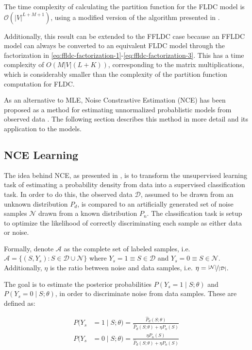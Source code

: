 \begin{proposition}
  The time complexity of calculating the partition function for the FLDC model is $\mathcal{O}(|V|^{L+M+1})$, using a modified version of the algorithm presented in \cite{tschiatschek16learning}.
\end{proposition}

Additionally, this result can be extended to the FFLDC case because an FFLDC model can always be converted to an equivalent FLDC model through the factorization in \ref{eq:ffldc-factorization-1}-\ref{eq:ffldc-factorization-3}. This has a time complexity of $O(M|V|(L+K))$, corresponding to the matrix multiplications, which is considerably smaller than the complexity of the partition function computation for FLDC.

As an alternative to MLE, Noise Constrastive Estimation (NCE) has been proposed as a method for estimating unnormalized probablistic models from observed data \cite{Gutmann12NCE}. The following section describes this method in more detail and its application to the models.

\subsection{NCE Learning}

The idea behind NCE, as presented in \cite{Gutmann12NCE}, is to transform the unsupervised learning task of estimating a probability density from data into a supervised classification task. In order to do this, the observed data $\mathcal{D}$, assumed to be drawn from an unknown distribution $P_{d}$, is compared to an artificially generated set of noise samples $\mathcal{N}$ drawn from a known distribution $P_{n}$. The classification task is setup to optimize the likelihood of correctly discriminating each sample as either data or noise.

Formally, denote $\mathcal{A}$ as the complete set of labeled samples, i.e. $\mathcal{A} = \{(S,Y_{s}) : S \in \mathcal{D} \cup \mathcal{N}\}$ where $Y_{s} = 1 \equiv S \in \mathcal{D}$ and $Y_{s} = 0 \equiv S \in \mathcal{N}$. Additionally, $\eta$ is the ratio between noise and data samples, i.e. $\eta = \nicefrac{|\mathcal{N}|}{|\mathcal{D}|}$.

The goal is to estimate the posterior probabilities $P(Y_{s} = 1 \mid S;\theta)$ and $P(Y_{s} = 0 \mid S;\theta)$, in order to discriminate noise from data samples. These are defined as:

\begin{align}
  P(Y_{s} &= 1 \mid S;\theta) = \frac{\hat{P}_{d}(S;\theta)}{\hat{P}_{d}(S;\theta) + \eta P_{n}(S)} \\
  P(Y_{s} &= 0 \mid S;\theta) = \frac{\eta P_{n}(S)}{\hat{P}_{d}(S;\theta) + \eta P_{n}(S)}
\end{align}

